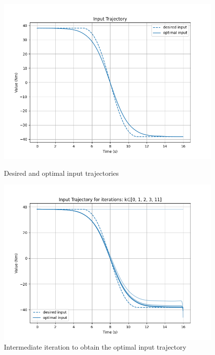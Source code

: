 \documentclass[a4paper,11pt,oneside]{book}
\begin{document}
\begin{itemize}
\begin{figure}[ht]
\begin{minipage}[t]{0.48\textwidth}
        \includegraphics[width=\textwidth]{Input_Trajectory_T1.png}
        \caption{Desired and optimal input trajectories}
        \label{fig:sinistra}
    \end{minipage}
    \hfill
    \begin{minipage}[t]{0.48\textwidth}
        \centering
        \includegraphics[width=\textwidth]{Input_Trajectory_for_iterations_T1.png}
        \caption{Intermediate iteration to obtain the optimal input trajectory}
        \label{fig:destra}
    \end{minipage}
\end{figure}


\end{itemize}
\end{document}
